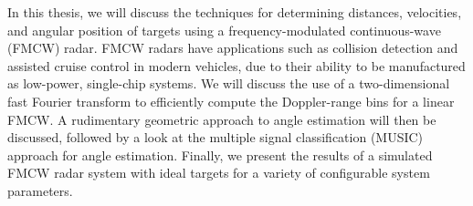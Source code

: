 In this thesis, we will discuss the
techniques for determining distances, velocities, and angular position of targets
using a frequency-modulated continuous-wave (FMCW) radar. FMCW radars have
applications such as collision detection and assisted
cruise control in modern vehicles, due to their ability to be manufactured as
low-power, single-chip systems. We will discuss the use of a two-dimensional
fast Fourier transform to efficiently compute the Doppler-range bins for a
linear FMCW. A rudimentary geometric approach to angle estimation will then be
discussed, followed by a look at the multiple signal classification (MUSIC)
approach for angle estimation. Finally, we present the results of a simulated
FMCW radar system with ideal targets for a variety of configurable system
parameters.
